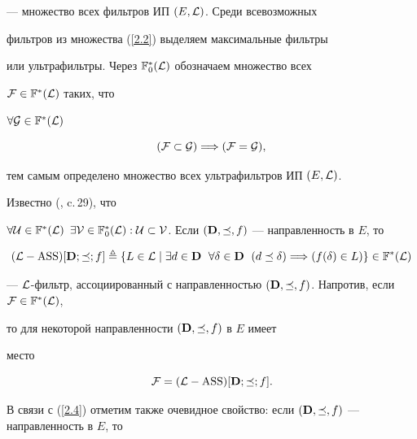 --- множество всех фильтров ИП $(E,{\cal L})$. Среди всевозможных


фильтров из множества (\ref{2.2}) выделяем максимальные фильтры


или ультрафильтры. Через ${{\Bbb F}_0^*}({\cal L})$ обозначаем множество всех


${\cal F} \in {{\Bbb F}^*}({\cal L})$ таких, что


$\forall{\cal G} \in {{\Bbb F}^*}({\cal L})$


\begin{equation}


\label{2.3}


({\cal F} \subset {\cal G}) \Lo ({\cal F} = {\cal G}),


\end{equation}


тем самым определено множество всех ультрафильтров ИП $(E,{\cal L})$.


Известно (\cite{5}, c.\,29), что


$\fo{\cal U} \in {{\Bbb F}^*}({\cal L})$ \; $\exi{\cal V} \in


{{\Bbb F}_0^*}({\cal L}):{\cal U} \subset


{\cal V}$. Если $({\bold D},\preceq,f)$ --- направленность в $E$, то


\begin{equation}\label{2.4}


({\cal L}-\ASS)[{\bold D};\preceq;f] \triangleq \{L \in {\cal L} \mid


\exi{d} \in {\bold D}\ \;\fo{\delta} \in {\bold D}\ \; (d \preceq \delta)


\Lo ({f(\delta)} \in L)\} \in {{\Bbb F}^*}({\cal L})


\end{equation}


--- ${\cal L}$-фильтр, ассоциированный с направленностью $({\bold


D},\preceq,f)$. Напротив, если ${\cal F} \in {{\Bbb F}^*}({\cal L})$,


то для некоторой направленности $({\bold D},\preceq,f)$ в $E$ имеет


место


\begin{equation}\label{eq25}


{\cal F} = ({\cal L}-\ASS)[{\bold D};\preceq;f].


\end{equation}


В связи с (\ref{2.4}) отметим также очевидное свойство: если $({\bold


D},\preceq,f)$ --- направленность в $E$, то


